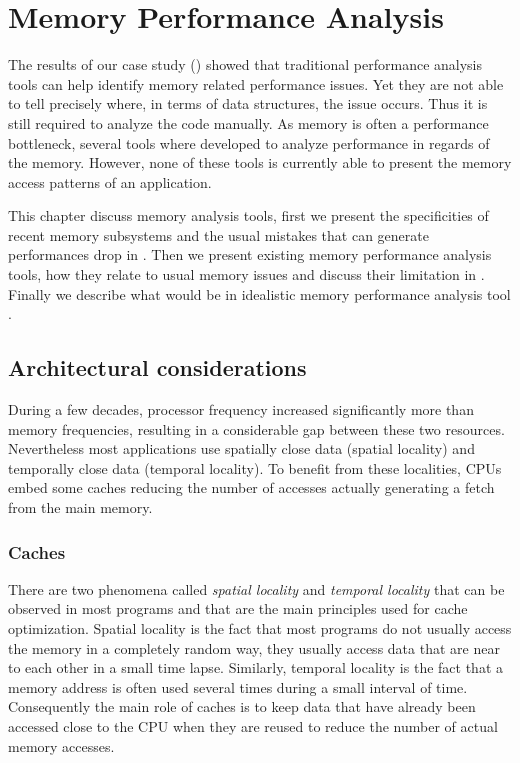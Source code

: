 \chapter{Memory Performance Analysis}
\label{chap:mem}

The results of our case study () showed that traditional performance analysis tools can help identify memory related performance issues.
Yet they are not able to tell precisely where, in terms of data structures, the issue occurs.
Thus it is still required to analyze the code manually.
As memory is often a performance bottleneck, several tools where developed to analyze performance in regards of the memory.
However, none of these tools is currently able to present the memory access patterns of an application.

This chapter discuss memory analysis tools, first we present the specificities of recent memory subsystems and the usual mistakes that can generate performances drop in .
Then we present existing memory performance analysis tools, how they relate to usual memory issues and discuss their limitation in .
Finally we describe what would be in idealistic memory performance analysis tool .

\section{Architectural considerations}
\label{sec:archi}

During a few decades, processor frequency increased significantly more than memory frequencies, resulting in a considerable gap between these two resources.
Nevertheless most applications use spatially close data (spatial locality) and temporally close data (temporal locality).
To benefit from these localities, \glspl{CPU} embed some caches reducing the number of accesses actually generating a fetch from the main memory.

\subsection{Caches}

There are two phenomena called \emph{spatial locality} and \emph{temporal locality} that can be observed in most programs and that are the main principles used for cache optimization.
Spatial locality is the fact that most programs do not usually access the memory in a completely random way, they usually access data that are near to each other in a small time lapse.
Similarly, temporal locality is the fact that a memory address is often used several times during a small interval of time.
Consequently the main role of caches is to keep data that have already been accessed close to the \gls{CPU} when they are reused to reduce the number of actual memory accesses.


